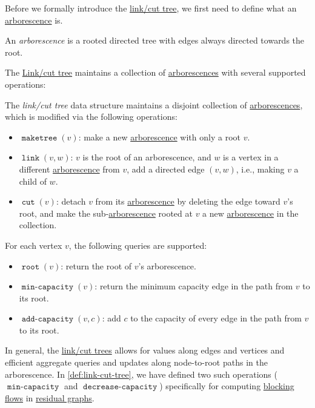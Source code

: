 Before we formally introduce the \hyperref[def:link-cut-tree]{link/cut tree}, we first need to define what an \hyperref[def:arborescence]{arborescence} is.

\begin{definition}[Arborescence]\label{def:arborescence}
	An \emph{arborescence} is a rooted directed tree with edges always directed towards the root.
\end{definition}

The \hyperref[def:link-cut-tree]{Link/cut tree} maintains a collection of \hyperref[def:arborescence]{arborescences} with several supported operations:

\begin{definition}\label{def:link-cut-tree}
	The \emph{link/cut tree} data structure maintains a disjoint collection of \hyperref[def:arborescence]{arborescences}, which is modified via the following operations:
	\begin{itemize}
		\item \(\operatorname{\texttt{maketree}}(v) \): make a new \hyperref[def:arborescence]{arborescence} with only a root \(v\).
		\item \(\operatorname{\texttt{link}}(v, w) \): \(v\) is the root of an arborescence, and \(w\) is a vertex in a different \hyperref[def:arborescence]{arborescence} from \(v\), add a directed edge \((v, w)\), i.e., making \(v\) a child of \(w\).
		\item \(\operatorname{\texttt{cut}}(v) \): detach \(v\) from its \hyperref[def:arborescence]{arborescence} by deleting the edge toward \(v\)'s root, and make the sub-\hyperref[def:arborescence]{arborescence} rooted at \(v\) a new \hyperref[def:arborescence]{arborescence} in the collection.
	\end{itemize}
	For each vertex \(v\), the following queries are supported:
	\begin{itemize}
		\item \(\operatorname{\texttt{root}}(v) \): return the root of \(v\)'s arborescence.
		\item \(\operatorname{\texttt{min-capacity}}(v) \): return the minimum capacity edge in the path from \(v\) to its root.
		\item \(\operatorname{\texttt{add-capacity}}(v, c) \): add \(c\) to the capacity of every edge in the path from \(v\) to its root.
	\end{itemize}
\end{definition}

\begin{note}
	In general, the \hyperref[def:link-cut-tree]{link/cut trees} allows for values along edges and vertices and efficient aggregate queries and updates along node-to-root paths in the arborescence. In \autoref{def:link-cut-tree}, we have defined two such operations (\(\operatorname{\texttt{min-capacity}}\) and \(\operatorname{\texttt{decrease-capacity}}\)) specifically for computing \hyperref[def:blocking-flow]{blocking flows} in \hyperref[def:residual-graph]{residual graphs}.
\end{note}

